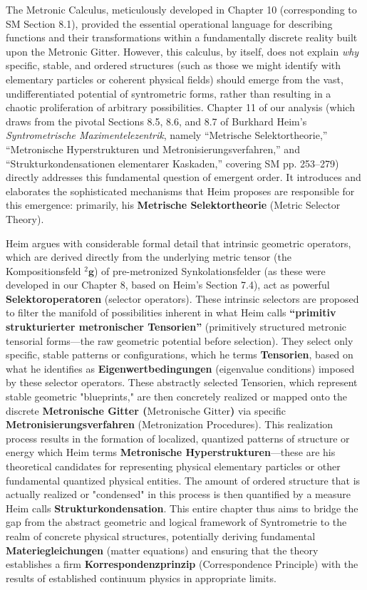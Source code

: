 \documentclass[12pt]{article}
\newcommand{\q}[1]{\enquote{#1}}
\newcommand{\kompositionsfeld}{{}^2\mathbf{g}}
\newcommand{\metronischegitter}{\text{Metronische Gitter}}
\begin{document}
The Metronic Calculus, meticulously developed in Chapter 10 (corresponding to SM Section 8.1), provided the essential operational language for describing functions and their transformations within a fundamentally discrete reality built upon the Metronic Gitter. However, this calculus, by itself, does not explain \textit{why} specific, stable, and ordered structures (such as those we might identify with elementary particles or coherent physical fields) should emerge from the vast, undifferentiated potential of syntrometric forms, rather than resulting in a chaotic proliferation of arbitrary possibilities. Chapter 11 of our analysis (which draws from the pivotal Sections 8.5, 8.6, and 8.7 of Burkhard Heim's \textit{Syntrometrische Maximentelezentrik}, namely \q{Metrische Selektortheorie,} \q{Metronische Hyperstrukturen und Metronisierungsverfahren,} and \q{Strukturkondensationen elementarer Kaskaden,} covering SM pp. 253–279) directly addresses this fundamental question of emergent order. It introduces and elaborates the sophisticated mechanisms that Heim proposes are responsible for this emergence: primarily, his \textbf{Metrische Selektortheorie} (Metric Selector Theory).

Heim argues with considerable formal detail that intrinsic geometric operators, which are derived directly from the underlying metric tensor (the Kompositionsfeld \( \kompositionsfeld \)) of pre-metronized Synkolationsfelder (as these were developed in our Chapter 8, based on Heim's Section 7.4), act as powerful \textbf{Selektoroperatoren} (selector operators). These intrinsic selectors are proposed to filter the manifold of possibilities inherent in what Heim calls \textbf{\q{primitiv strukturierter metronischer Tensorien}} (primitively structured metronic tensorial forms—the raw geometric potential before selection). They select only specific, stable patterns or configurations, which he terms \textbf{Tensorien}, based on what he identifies as \textbf{Eigenwertbedingungen} (eigenvalue conditions) imposed by these selector operators. These abstractly selected Tensorien, which represent stable geometric "blueprints," are then concretely realized or mapped onto the discrete \textbf{Metronische Gitter (\(\metronischegitter\))} via specific \textbf{Metronisierungsverfahren} (Metronization Procedures). This realization process results in the formation of localized, quantized patterns of structure or energy which Heim terms \textbf{Metronische Hyperstrukturen}—these are his theoretical candidates for representing physical elementary particles or other fundamental quantized physical entities. The amount of ordered structure that is actually realized or "condensed" in this process is then quantified by a measure Heim calls \textbf{Strukturkondensation}. This entire chapter thus aims to bridge the gap from the abstract geometric and logical framework of Syntrometrie to the realm of concrete physical structures, potentially deriving fundamental \textbf{Materiegleichungen} (matter equations) and ensuring that the theory establishes a firm \textbf{Korrespondenzprinzip} (Correspondence Principle) with the results of established continuum physics in appropriate limits.
\end{document}
